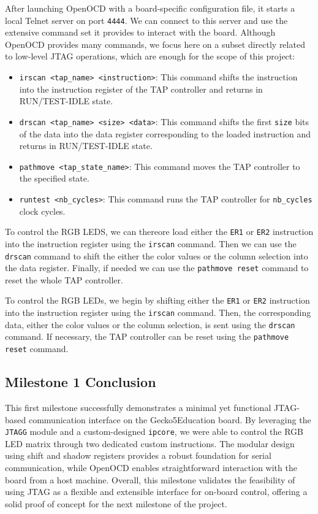 \documentclass[a4paper,11pt,oneside]{report}
\newcommand{\boardName}{Gecko5Education \xspace}
\begin{document}
After launching OpenOCD with a board-specific configuration file, it starts a local Telnet server on port \texttt{4444}.  
We can connect to this server and use the extensive command set it provides to interact with the board.  
Although OpenOCD provides many commands, we focus here on a subset directly related to low-level JTAG operations, which are enough for the scope of this project:

\begin{itemize}
    \item \verb|irscan <tap_name> <instruction>|: This command shifts the instruction into the instruction register of the TAP controller and returns in RUN/TEST-IDLE state.
    \item \verb|drscan <tap_name> <size> <data>|: This command shifts the first \texttt{size} bits of the data into the data register corresponding to the loaded instruction and returns in RUN/TEST-IDLE state.
    \item \verb|pathmove <tap_state_name>|: This command moves the TAP controller to the specified state.
    \item \verb|runtest <nb_cycles>|: This command runs the TAP controller for \texttt{nb\_cycles} clock cycles.
\end{itemize}

To control the RGB LEDS, we can thereore load either the \texttt{ER1} or \texttt{ER2} instruction into the instruction register using the \texttt{irscan} command.
Then we can use the \texttt{drscan} command to shift the either the color values or the column selection into the data register.
Finally, if needed we can use the \texttt{pathmove reset} command to reset the whole TAP controller.

To control the RGB LEDs, we begin by shifting either the \texttt{ER1} or \texttt{ER2} instruction into the instruction register using the \texttt{irscan} command.  
Then, the corresponding data, either the color values or the column selection, is sent using the \texttt{drscan} command.  
If necessary, the TAP controller can be reset using the \texttt{pathmove reset} command.

\subsection{Milestone 1 Conclusion}

This first milestone successfully demonstrates a minimal yet functional JTAG-based communication interface on the \boardName board.  
By leveraging the \texttt{JTAGG} module and a custom-designed \texttt{ipcore}, we were able to control the RGB LED matrix through two dedicated custom instructions.  
The modular design using shift and shadow registers provides a robust foundation for serial communication, while OpenOCD enables straightforward interaction with the board from a host machine.  
Overall, this milestone validates the feasibility of using JTAG as a flexible and extensible interface for on-board control, offering a solid proof of concept for the next milestone of the project.
\end{document}
